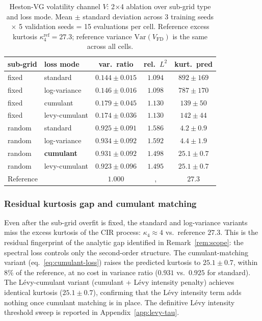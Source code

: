 \documentclass[review,12pt]{elsarticle}
\begin{document}
\begin{table}[h]
\centering
\caption{Heston-VG volatility channel \(V\): 2\(\times\)4 ablation
over sub-grid type and loss mode. Mean \(\pm\) standard deviation
across 3 training seeds \(\times\) 5 validation seeds = 15 evaluations
per cell. Reference excess kurtosis \(\kappa_4^{\mathrm{ref}} = 27.3\);
reference variance \(\mathrm{Var}(V_{\mathrm{FD}})\) is the same
across all cells.}
\label{tab:heston-2x4}
\begin{tabular}{l l c c c}
\toprule
sub-grid & loss mode & var.\ ratio & rel.\ $L^2$ & kurt.\ pred \\
\midrule
fixed & standard   & \(0.144 \pm 0.015\) & \(1.094\) & \(892 \pm 169\) \\
fixed & log-variance & \(0.146 \pm 0.016\) & \(1.098\) & \(787 \pm 170\) \\
fixed & cumulant   & \(0.179 \pm 0.045\) & \(1.130\) & \(139 \pm 50\) \\
fixed & levy-cumulant & \(0.174 \pm 0.036\) & \(1.130\) & \(142 \pm 44\) \\
\midrule
random & standard   & \(0.925 \pm 0.091\) & \(1.586\) & \(4.2 \pm 0.9\) \\
random & log-variance & \(0.934 \pm 0.092\) & \(1.592\) & \(4.4 \pm 1.9\) \\
random & \textbf{cumulant} & \(\mathbf{0.931 \pm 0.092}\) & \(1.498\) & \(\mathbf{25.1 \pm 0.7}\) \\
random & levy-cumulant & \(0.923 \pm 0.096\) & \(1.495\) & \(25.1 \pm 0.7\) \\
\midrule
\multicolumn{2}{l}{Reference} & $1.000$ &, & $27.3$ \\
\bottomrule
\end{tabular}
\end{table}

\subsubsection{Residual kurtosis gap and cumulant matching}

Even after the sub-grid overfit is fixed, the standard and
log-variance variants miss the excess kurtosis of the CIR
process: \(\kappa_4 \approx 4\) vs.\ reference \(27.3\). This
is the residual fingerprint of the analytic gap identified in
Remark~\ref{rem:scope}: the spectral loss controls only the
second-order structure. The cumulant-matching variant
(eq.~\eqref{eq:cumulant-loss}) raises the predicted kurtosis
to \(25.1 \pm 0.7\), within 8\% of the reference, at no cost in
variance ratio (\(0.931\) vs.\ \(0.925\) for standard). The
L\'evy-cumulant variant (cumulant + L\'evy intensity penalty)
achieves identical kurtosis (\(25.1 \pm 0.7\)), confirming that
the L\'evy intensity term adds nothing once cumulant matching
is in place. The definitive L\'evy intensity threshold sweep is
reported in Appendix~\ref{app:levy-tau}.
\end{document}
